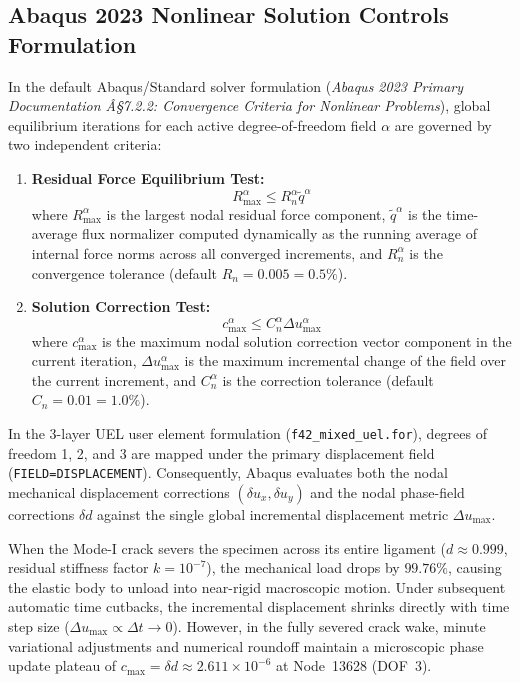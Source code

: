 \subsection{Abaqus 2023 Nonlinear Solution Controls Formulation}
\label{subsec:stage14uah_abaqus_formulation}

In the default Abaqus/Standard solver formulation (\textit{Abaqus 2023 Primary Documentation Â§7.2.2: Convergence Criteria for Nonlinear Problems}), global equilibrium iterations for each active degree-of-freedom field $\alpha$ are governed by two independent criteria:
\begin{enumerate}
  \item \textbf{Residual Force Equilibrium Test:}
  \begin{equation}
    R_{\max}^\alpha \le R_n^\alpha \tilde{q}^\alpha
    \label{eq:abaqus_residual_criterion}
  \end{equation}
  where $R_{\max}^\alpha$ is the largest nodal residual force component, $\tilde{q}^\alpha$ is the time-average flux normalizer computed dynamically as the running average of internal force norms across all converged increments, and $R_n^\alpha$ is the convergence tolerance (default $R_n = 0.005 = 0.5\%$).
  \item \textbf{Solution Correction Test:}
  \begin{equation}
    c_{\max}^\alpha \le C_n^\alpha \Delta u_{\max}^\alpha
    \label{eq:abaqus_correction_criterion}
  \end{equation}
  where $c_{\max}^\alpha$ is the maximum nodal solution correction vector component in the current iteration, $\Delta u_{\max}^\alpha$ is the maximum incremental change of the field over the current increment, and $C_n^\alpha$ is the correction tolerance (default $C_n = 0.01 = 1.0\%$).
\end{enumerate}

In the 3-layer UEL user element formulation (\texttt{f42\_mixed\_uel.for}), degrees of freedom 1, 2, and 3 are mapped under the primary displacement field (\texttt{FIELD=DISPLACEMENT}). Consequently, Abaqus evaluates both the nodal mechanical displacement corrections $(\delta u_x, \delta u_y)$ and the nodal phase-field corrections $\delta d$ against the single global incremental displacement metric $\Delta u_{\max}$.

When the Mode-I crack severs the specimen across its entire ligament ($d \approx 0.999$, residual stiffness factor $k = 10^{-7}$), the mechanical load drops by $99.76\%$, causing the elastic body to unload into near-rigid macroscopic motion. Under subsequent automatic time cutbacks, the incremental displacement shrinks directly with time step size ($\Delta u_{\max} \propto \Delta t \to 0$). However, in the fully severed crack wake, minute variational adjustments and numerical roundoff maintain a microscopic phase update plateau of $c_{\max} = \delta d \approx 2.611\times 10^{-6}$ at Node~13628 (DOF~3). 

